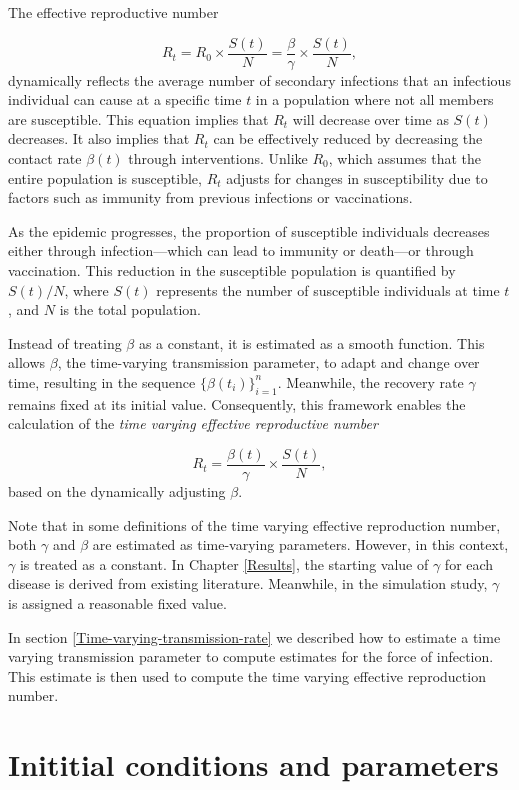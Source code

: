\documentclass[
11pt, %
oneside, %
english, %
singlespacing, %
]{macthesis} %
\begin{document}
The effective reproductive number

\[
R_t = R_0 \times \frac{S(t)}{N} = \frac{\beta}{\gamma} \times \frac{S(t)}{N},
\]
dynamically reflects the average number of secondary infections that an infectious individual can cause at a specific time \(t\) in a population where not all members are susceptible. This equation implies that \(R_t\) will decrease over time as \(S(t)\) decreases. It also implies that \(R_t\) can be effectively reduced by decreasing the contact rate \(\beta(t)\) through interventions. Unlike \(R_0\), which assumes that the entire population is susceptible, \(R_t\) adjusts for changes in susceptibility due to factors such as immunity from previous infections or vaccinations.

As the epidemic progresses, the proportion of susceptible individuals decreases either through infection---which can lead to immunity or death---or through vaccination. This reduction in the susceptible population is quantified by \(S(t)/N\), where \(S(t)\) represents the number of susceptible individuals at time \(t\), and \(N\) is the total population.

Instead of treating \(\beta\) as a constant, it is estimated as a smooth function. This allows \(\beta\), the time-varying transmission parameter, to adapt and change over time, resulting in the sequence \(\{\beta(t_i)\}_{i=1}^n\). Meanwhile, the recovery rate \(\gamma\) remains fixed at its initial value. Consequently, this framework enables the calculation of the \emph{time varying effective reproductive number}

\[
     R_t = \frac{\beta(t)}{\gamma} \times \frac{S(t)}{N},
\]
based on the dynamically adjusting \(\beta\).

Note that in some definitions of the time varying effective reproduction number, both \(\gamma\) and \(\beta\) are estimated as time-varying parameters. However, in this context, \(\gamma\) is treated as a constant. In Chapter \ref{Results}, the starting value of \(\gamma\) for each disease is derived from existing literature. Meanwhile, in the simulation study, \(\gamma\) is assigned a reasonable fixed value.

In section \ref{Time-varying-transmission-rate} we described how to estimate a time varying transmission parameter to compute estimates for the force of infection. This estimate is then used to compute the time varying effective reproduction number.

\section{Inititial conditions and parameters}\label{Initial-conditions-and-parameters}
\end{document}
